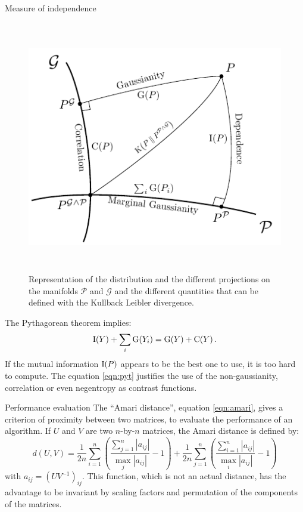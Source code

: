 \documentclass{beamer}
\newcommand{\zZ}[2]{\mathrm #1\!\zp{#2}}
\newcommand{\zD}{\mathcal}
\begin{document}
\begin{frame}{}
\begin{columns}[T]
\begin{column}{.48\linewidth}
\begin{block}{Measure of independence}
\begin{figure}
\label{fig:sketch}
\centering
  \includegraphics[height = 11cm, width=\textwidth]{../figure_tikz/theory_info}
  \caption{Representation of the distribution and the different projections on the manifolds $\zD P$ and $\zD G$ and the different quantities that can be defined with the Kullback Leibler divergence.}
\end{figure}

The Pythagorean theorem implies:
\begin{equation}
\label{eqn:pyt}
        \zZ IY + \sum_i\zZ G{Y_i} = \zZ GY + \zZ CY.
\end{equation}
If the mutual information $\zZ I P$ appears to be the best one to use, it is too hard to compute.
The equation \ref{eqn:pyt} justifies the use of the non-gaussianity, correlation or even negentropy as contrast functions.

\end{block}


\begin{block}{Performance evaluation}
The ``Amari distance'', equation \ref{eqn:amari}, gives a criterion of proximity between two matrices, to evaluate the performance of an algorithm.
If $U$ and $V$ are two $n$-by-$n$ matrices, the Amari distance is defined by:
\begin{equation} \label{eqn:amari}
	d(U,V) = \frac{1}{2n}\sum\limits_{i=1}^n \left(\frac{\sum\limits_{j=1}^n|a_{ij}|}{\max_j |a_{ij}|}-1 \right)+\frac{1}{2n}\sum\limits_{j=1}^n \left(\frac{\sum\limits_{i=1}^n|a_{ij}|}{\max_i |a_{ij}|}-1 \right)
\end{equation}
with $a_{ij} = (UV^{-1})_{ij}$.
This function, which is not an actual distance, has the advantage to be invariant by scaling factors and permutation of the components of the matrices.


\end{block}
\end{column}
\end{columns}
\end{frame}
\end{document}
